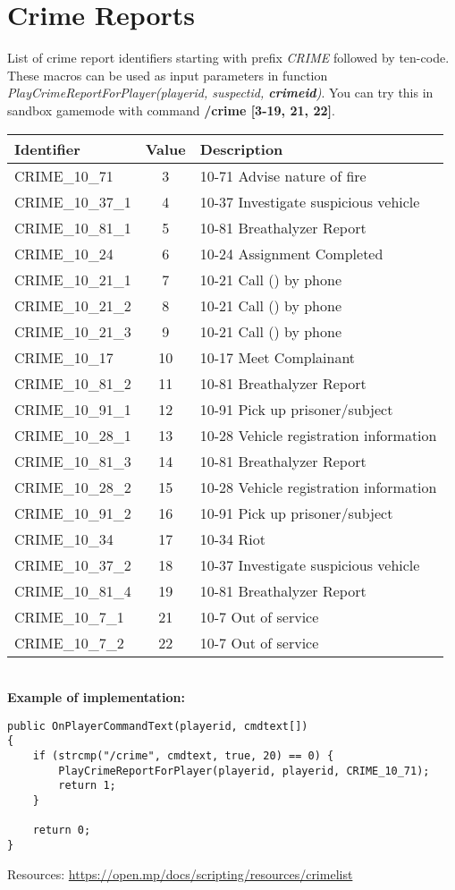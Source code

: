 \documentclass{article}
\begin{document}
\section{Crime Reports}
\begin{sloppypar}
List of crime report identifiers starting with prefix \textit{CRIME} followed by ten-code. These macros can be used as input parameters in function \textit{PlayCrimeReportForPlayer(playerid, suspectid, \textbf{crimeid})}. You can try this in sandbox gamemode with command \textbf{/crime [3-19, 21, 22]}.
\end{sloppypar}
\bigskip
\noindent\begin{tabular}{ |l|c|l| } 
\hline
Identifier & Value & Description \\
\hline
CRIME\_10\_71 & 3 & 10-71 Advise nature of fire \\
CRIME\_10\_37\_1 & 4 & 10-37 Investigate suspicious vehicle \\
CRIME\_10\_81\_1 & 5 & 10-81 Breathalyzer Report \\
CRIME\_10\_24 & 6 & 10-24 Assignment Completed \\
CRIME\_10\_21\_1 & 7 & 10-21 Call () by phone \\
CRIME\_10\_21\_2 & 8 & 10-21 Call () by phone \\
CRIME\_10\_21\_3 & 9 & 10-21 Call () by phone \\
CRIME\_10\_17 & 10 & 10-17 Meet Complainant \\
CRIME\_10\_81\_2 & 11 & 10-81 Breathalyzer Report \\
CRIME\_10\_91\_1 & 12 & 10-91 Pick up prisoner/subject \\
CRIME\_10\_28\_1 & 13 & 10-28 Vehicle registration information \\
CRIME\_10\_81\_3 & 14 & 10-81 Breathalyzer Report \\
CRIME\_10\_28\_2 & 15 & 10-28 Vehicle registration information \\
CRIME\_10\_91\_2 & 16 & 10-91 Pick up prisoner/subject \\
CRIME\_10\_34 & 17 & 10-34 Riot \\
CRIME\_10\_37\_2 & 18 & 10-37 Investigate suspicious vehicle \\
CRIME\_10\_81\_4 & 19 & 10-81 Breathalyzer Report \\
CRIME\_10\_7\_1 & 21 & 10-7 Out of service \\
CRIME\_10\_7\_2 & 22 & 10-7 Out of service \\
\hline
\end{tabular}
\bigskip
\\\textbf{Example of implementation:}
\begin{verbatim}
public OnPlayerCommandText(playerid, cmdtext[])
{
    if (strcmp("/crime", cmdtext, true, 20) == 0) {
        PlayCrimeReportForPlayer(playerid, playerid, CRIME_10_71);
        return 1;
    }

    return 0;
}
\end{verbatim}
\bigskip
Resources: \url{https://open.mp/docs/scripting/resources/crimelist}
\end{document}
